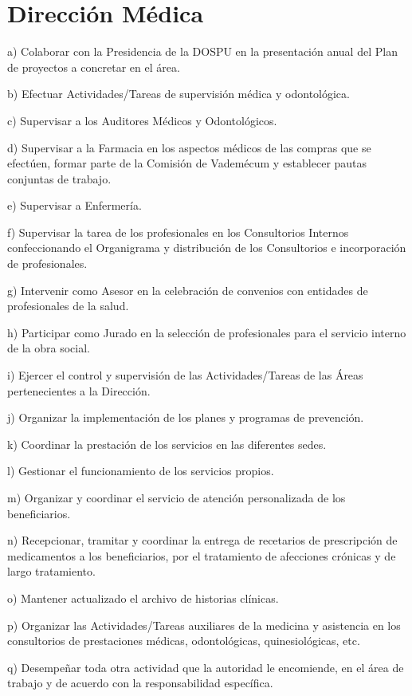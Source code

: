 \section{Dirección Médica}
\begin{displayquote}
a) Colaborar con la Presidencia de la DOSPU en la presentación anual del Plan de proyectos a concretar en el área.

b) Efectuar Actividades/Tareas de supervisión médica y odontológica.

c) Supervisar a los Auditores Médicos y Odontológicos.

d) Supervisar a la Farmacia en los aspectos médicos de las compras que se efectúen, formar parte de la Comisión de Vademécum y establecer pautas conjuntas de trabajo.

e) Supervisar a Enfermería.

f) Supervisar la tarea de los profesionales en los Consultorios Internos confeccionando el Organigrama y distribución de los Consultorios e incorporación de profesionales.

g) Intervenir como Asesor en la celebración de convenios con entidades de profesionales de la salud.

h) Participar como Jurado en la selección de profesionales para el servicio interno de la obra social.

i) Ejercer el control y supervisión de las Actividades/Tareas de las Áreas pertenecientes a la Dirección.

j) Organizar la implementación de los planes y programas de prevención.

k) Coordinar la prestación de los servicios en las diferentes sedes.

l) Gestionar el funcionamiento de los servicios propios.

m) Organizar y coordinar el servicio de atención personalizada de los beneficiarios.

n) Recepcionar, tramitar y coordinar la entrega de recetarios de prescripción de medicamentos a los beneficiarios, por el tratamiento de afecciones crónicas y de largo tratamiento.

o) Mantener actualizado el archivo de historias clínicas.

p) Organizar las Actividades/Tareas auxiliares de la medicina y asistencia en los consultorios de prestaciones médicas, odontológicas, quinesiológicas, etc.

q) Desempeñar toda otra actividad que la autoridad le encomiende, en el área de trabajo y de acuerdo con la responsabilidad específica.
\hfill\parencite{CSOrd17}
\end{displayquote}

